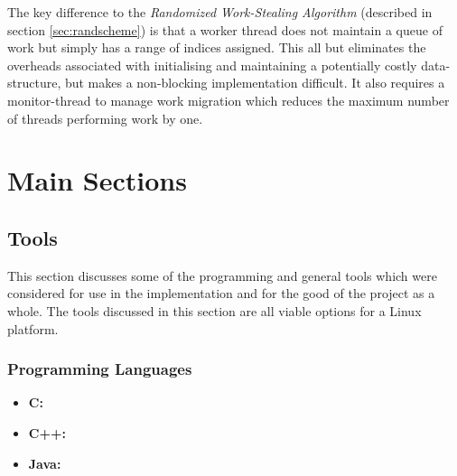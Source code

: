 The key difference to the \textit{Randomized Work-Stealing Algorithm} (described in section \ref{sec:randscheme}) is that a worker
thread does not maintain a queue of work but simply has a range of indices assigned. This all but eliminates the overheads associated with initialising and 
maintaining a potentially costly data-structure, but makes a non-blocking implementation difficult. It also requires a monitor-thread to manage
work migration which reduces the maximum number of threads performing work by one.


\chapter{Main Sections}
\section{Tools}

This section discusses some of the programming and general tools which were considered
for use in the implementation and for the good of the project as a whole.
The tools discussed in this section are all viable options for a Linux platform.

\subsection*{Programming Languages}

\begin{itemize}
\item \textbf{C:} 
\item \textbf{C++:}
\item \textbf{Java:}
\end{itemize}

